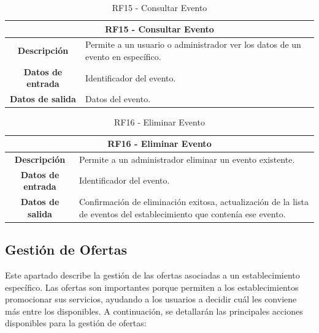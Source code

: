 \begin{table}[H]
    \centering
    \begin{tabular}{|c|p{10cm}|}
        \hline
        \multicolumn{2}{|c|}{\textbf{RF15 - Consultar Evento}}                                                     \\
        \hline
        \textbf{Descripción}      & Permite a un usuario o administrador ver los datos de un evento en específico. \\
        \hline
        \textbf{Datos de entrada} & Identificador del evento.                                                      \\
        \hline
        \textbf{Datos de salida}  & Datos del evento.                                                              \\
        \hline
    \end{tabular}
    \caption{RF15 - Consultar Evento}
\end{table}

\begin{table}[H]
    \centering
    \begin{tabular}{|c|p{10cm}|}
        \hline
        \multicolumn{2}{|c|}{\textbf{RF16 - Eliminar Evento}}                                                                                              \\
        \hline
        \textbf{Descripción}      & Permite a un administrador eliminar un evento existente.                                                               \\
        \hline
        \textbf{Datos de entrada} & Identificador del evento.                                                                                              \\
        \hline
        \textbf{Datos de salida}  & Confirmación de eliminación exitosa, actualización de la lista de eventos del establecimiento que contenía ese evento. \\
        \hline
    \end{tabular}
    \caption{RF16 - Eliminar Evento}
\end{table}

\subsection{Gestión de Ofertas}

Este apartado describe la gestión de las ofertas asociadas a un establecimiento específico. Las ofertas son importantes porque permiten a los establecimientos promocionar sus servicios, ayudando a los usuarios a decidir cuál les conviene más entre los disponibles. A  continuación, se detallarán las principales acciones disponibles para la gestión de ofertas:


